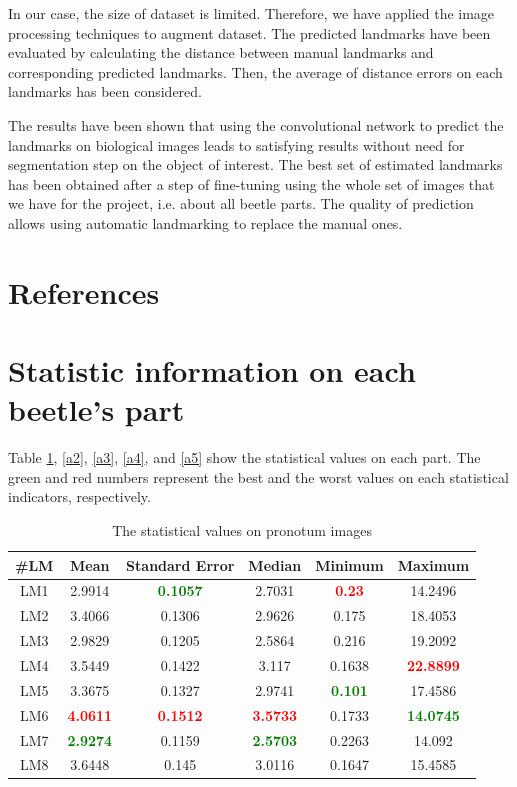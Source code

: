 \documentclass[review]{elsarticle}
\begin{document}
In our case, the size of dataset is limited. Therefore, we have applied the image processing techniques to augment dataset. The predicted landmarks have been evaluated by calculating the distance between manual landmarks and corresponding predicted landmarks. Then, the average of distance errors on each landmarks has been considered.

The results have been shown that using the convolutional network to predict the landmarks on biological images leads to satisfying results without need for segmentation step on the object of interest. The
best set of estimated landmarks has been obtained after a step
of fine-tuning using the whole set of images that we have for the
project, i.e. about all beetle parts. The quality of prediction allows using automatic landmarking to replace the manual ones.
\section*{References}



\pagebreak
\appendix
\section{Statistic information on each beetle's part}
\label{appdixA}
Table \ref{a1}, \ref{a2}, \ref{a3}, \ref{a4}, and \ref{a5} show the statistical values on each part. The green and red numbers represent the best and the worst values on each statistical indicators, respectively.  
\begin{table}[htbp]
\begin{tabular}{ | c | c | c | c | c | c | }
\hline
	\textbf{\#LM} & \textbf{Mean} & \textbf{Standard Error} & \textbf{Median} & \textbf{Minimum} & \textbf{Maximum} \\ \hline
	LM1 & 2.9914 & \textcolor{green}{\textbf{0.1057}} & 2.7031 & \textcolor{red}{\textbf{0.23}} & 14.2496 \\ \hline
	LM2 & 3.4066 & 0.1306 & 2.9626 & 0.175 & 18.4053 \\ \hline
	LM3 & 2.9829 & 0.1205 & 2.5864 & 0.216 & 19.2092 \\ \hline
	LM4 & 3.5449 & 0.1422 & 3.117 & 0.1638 & \textcolor{red}{\textbf{22.8899}} \\ \hline
	LM5 & 3.3675 & 0.1327 & 2.9741 & \textcolor{green}{\textbf{0.101}} & 17.4586 \\ \hline
	LM6 & \textcolor{red}{\textbf{4.0611}} & \textcolor{red}{\textbf{0.1512}} & \textcolor{red}{\textbf{3.5733}} & 0.1733 & \textcolor{green}{\textbf{14.0745}} \\ \hline
	LM7 & \textcolor{green}{\textbf{2.9274}} & 0.1159 & \textcolor{green}{\textbf{2.5703}} & 0.2263 & 14.092 \\ \hline
	LM8 & 3.6448 & 0.145 & 3.0116 & 0.1647 & 15.4585 \\ \hline
\end{tabular}
\caption{The statistical values on pronotum images}
\label{a1}
\end{table}
\end{document}
